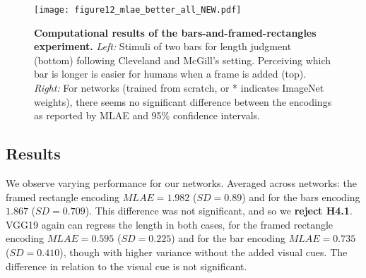 \begin{figure}[tb]
  \centering
  \texttt{[image: figure12\_mlae\_better\_all\_NEW.pdf]}
  \caption{\textbf{Computational results of the bars-and-framed-rectangles experiment.} \textit{Left:} Stimuli of two bars for length judgment (bottom) following Cleveland and McGill's setting. Perceiving which bar is longer is  easier for humans when a frame is added (top). \textit{Right:} For networks (trained from scratch, or * indicates ImageNet weights), there seems no significant difference between the encodings as reported by MLAE and  95\% confidence intervals.}
	\label{fig:figure12_mlae}
\end{figure}

\subsection{Results}

 We observe varying performance for our networks. Averaged across networks: the framed rectangle encoding $MLAE=1.982$ ($SD=0.89$) and for the bars encoding $1.867$ ($SD=0.709$). This difference was not significant, and so we \textbf{reject H4.1}. VGG19 again can regress the length in both cases, for the framed rectangle encoding $MLAE=0.595$ ($SD=0.225$) and for the bar encoding $MLAE=0.735$ ($SD=0.410$), though with higher variance without the added visual cues. The difference in relation to the visual cue is not significant. %



